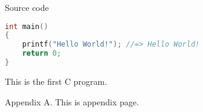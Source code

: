 \begin{frame}[fragile]{Source code}

\begin{lstlisting}[caption=First C example,language=C]
int main()
{
    printf("Hello World!"); //=> Hello World!
    return 0;
}
\end{lstlisting}

This is the first C program.
\end{frame}

\beginappendix{} %

\begin{frame}{Appendix A.}
  This is appendix page.
\end{frame}

%  
